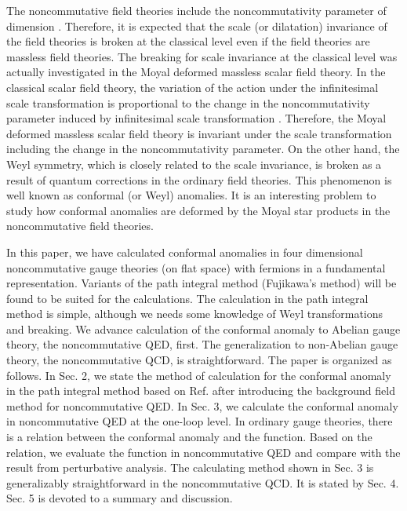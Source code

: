 \documentclass[a4paper,12pt]{article}
\begin{document}
The noncommutative field theories include the noncommutativity parameter 
\myHighlight{$\theta$}\coordHE{} of dimension \coordHE{}. Therefore, it is expected that 
the scale (or dilatation) invariance of the field theories is broken at the 
classical level even if the field theories are massless field theories. The 
breaking for scale invariance at the classical level was actually 
investigated in the Moyal deformed massless scalar field theory. 
In the classical scalar field theory, 
the variation of the action under the infinitesimal scale 
transformation is proportional to the change in the noncommutativity 
parameter induced by infinitesimal scale transformation \cite{AGJGHGLPMSRW}. 
Therefore, the Moyal deformed massless scalar field theory is invariant 
under the scale transformation including the change in the noncommutativity 
parameter. 
On the other hand, the Weyl symmetry, which is closely related to the scale 
invariance, is broken as a result of quantum corrections in the ordinary field 
theories. This phenomenon is well known as 
conformal (or Weyl) anomalies. It is an interesting problem to study how 
conformal anomalies are deformed by the Moyal star products in the 
noncommutative field theories. 


In this paper, we have calculated conformal 
anomalies in four dimensional noncommutative gauge theories (on flat space) 
with fermions in a fundamental representation. Variants of 
the path integral method (Fujikawa's method) will be found to be 
suited for the calculations. The calculation in the path integral method is 
simple, although we needs some knowledge of Weyl 
transformations and breaking. 
We advance calculation of the conformal anomaly to Abelian gauge theory, 
the noncommutative QED, first. The generalization to 
non-Abelian gauge theory, the noncommutative 
QCD, is straightforward. The paper is organized as follows. 
In Sec. 2, we state the method of calculation for the conformal 
anomaly in the path integral method based on Ref. \cite{KF} after 
introducing the background field method for noncommutative QED. In Sec. 3, we 
calculate the conformal anomaly in noncommutative QED at the one-loop level. 
In ordinary gauge theories, 
there is a relation between the conformal anomaly and the \myHighlight{$\beta$}\coordHE{} function. 
Based on the relation, we evaluate the \myHighlight{$\beta$}\coordHE{} function in noncommutative 
QED and compare with the result from perturbative analysis. 
The calculating method shown in Sec. 3 is generalizably 
straightforward in the noncommutative QCD. It is stated by Sec. 4. 
Sec. 5 is devoted to a summary and discussion. 
\end{document}

